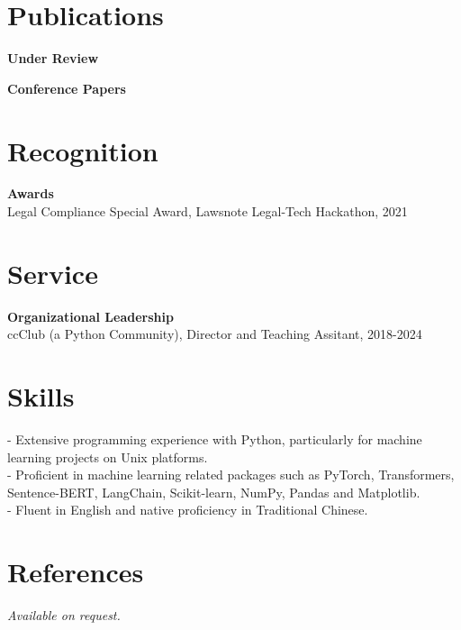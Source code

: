 \documentclass{article}
\begin{document}
\setlength{\leftmargini}{0em}
\section{Publications}
\vspace{\baselineskip}
\noindent\textbf{Under Review}\\
\begin{verse}
\end{verse}
\vspace{\baselineskip}
\noindent\textbf{Conference Papers}\\
\begin{verse}
\end{verse}
\begin{verse}
\end{verse}
\begin{verse}
\end{verse}
\vspace{1em}
\section{Recognition}
\noindent\textbf{Awards}\\
Legal Compliance Special Award, Lawsnote Legal-Tech Hackathon, 2021\\






\section{Service}
\noindent\textbf{Organizational Leadership}\\
ccClub (a Python Community), Director and Teaching Assitant, 2018-2024\\






\section{Skills}\noindent - Extensive programming experience with Python, particularly for machine learning projects on Unix platforms.\\ - Proficient in machine learning related packages such as PyTorch, Transformers, Sentence-BERT, LangChain, Scikit-learn, NumPy, Pandas and Matplotlib.\\ - Fluent in English and native proficiency in Traditional Chinese.



\section{References}\noindent \emph{Available on request.}

\end{document}
